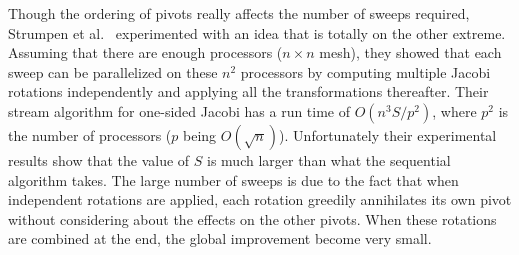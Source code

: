 \documentclass[10pt, conference, compsocconf]{IEEEtran}
\begin{document}

Though the ordering of pivots really affects the number of sweeps required, Strumpen et al.~\cite{strumpen2003stream} experimented with an idea that is totally on the other extreme. Assuming that there are enough processors ($n \times n$ mesh), they showed that each sweep can be parallelized on these $n^2$ processors by computing multiple Jacobi rotations independently and applying all the transformations thereafter. Their stream algorithm for one-sided Jacobi has a run time of $O(n^3S/p^2)$, where $p^2$ is the number of processors ($p$ being $O(\sqrt{n})$). Unfortunately their experimental results show that the value of $S$ is much larger than what the sequential algorithm takes. The large number of sweeps is due to the fact that when independent rotations are applied, each rotation greedily annihilates its own pivot without considering about the effects on the other pivots. When these rotations are combined at the end, the global improvement become very small.
\end{document}

